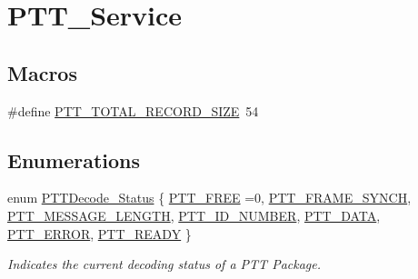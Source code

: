 \hypertarget{group___p_t_t___service}{}\section{P\+T\+T\+\_\+\+Service}
\label{group___p_t_t___service}
\subsection*{Macros}
\begin{DoxyCompactItemize}
\item 
\#define \hyperlink{group___p_t_t___service_gab50c3b95c842350db5767685feb81aa7}{P\+T\+T\+\_\+\+T\+O\+T\+A\+L\+\_\+\+R\+E\+C\+O\+R\+D\+\_\+\+S\+I\+ZE}~54
\end{DoxyCompactItemize}
\subsection*{Enumerations}
\begin{DoxyCompactItemize}
\item 
enum \hyperlink{group___p_t_t___service_ga26a2a479755f5b679cd4ac31c4f18452}{P\+T\+T\+Decode\+\_\+\+Status} \{ \newline
\hyperlink{group___p_t_t___service_gga26a2a479755f5b679cd4ac31c4f18452a0c6a2cf2466fedd6c934f7661d4401a7}{P\+T\+T\+\_\+\+F\+R\+EE} =0, 
\hyperlink{group___p_t_t___service_gga26a2a479755f5b679cd4ac31c4f18452afb6100429e684a0bb069aeae42d61d61}{P\+T\+T\+\_\+\+F\+R\+A\+M\+E\+\_\+\+S\+Y\+N\+CH}, 
\hyperlink{group___p_t_t___service_gga26a2a479755f5b679cd4ac31c4f18452a93b2c97af091bfaf7d5da22ee601cc48}{P\+T\+T\+\_\+\+M\+E\+S\+S\+A\+G\+E\+\_\+\+L\+E\+N\+G\+TH}, 
\hyperlink{group___p_t_t___service_gga26a2a479755f5b679cd4ac31c4f18452af58daa1a94c32302e14963761ba5bf93}{P\+T\+T\+\_\+\+I\+D\+\_\+\+N\+U\+M\+B\+ER}, 
\newline
\hyperlink{group___p_t_t___service_gga26a2a479755f5b679cd4ac31c4f18452af7eddf0036edf87c26c2f463a00c96c3}{P\+T\+T\+\_\+\+D\+A\+TA}, 
\hyperlink{group___p_t_t___service_gga26a2a479755f5b679cd4ac31c4f18452a754b1d5abc357d34300514913a9ac78b}{P\+T\+T\+\_\+\+E\+R\+R\+OR}, 
\hyperlink{group___p_t_t___service_gga26a2a479755f5b679cd4ac31c4f18452a54116d0e0f37b2732f4cc43a17ddd2a5}{P\+T\+T\+\_\+\+R\+E\+A\+DY}
 \}\begin{DoxyCompactList}\small\item\em Indicates the current decoding status of a P\+TT Package. \end{DoxyCompactList}
\end{DoxyCompactItemize}
